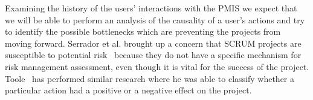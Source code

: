 \documentclass[a4paper, 12pt]{article}
\begin{document}
Examining the history of the users’ interactions with the PMIS we expect that we will be able to perform an analysis of the causality of a user’s actions and try to identify the possible bottlenecks which are preventing the projects from moving forward. Serrador et al. brought up a concern that SCRUM projects are susceptible to potential risk~\cite{tavares2019risk} because they do not have a specific mechanism for risk management assessment, even though it is vital for the success of the project. Toole~\cite{Toole2006APM} has performed similar research where he was able to classify whether a particular action had a positive or a negative effect on the project. 

%
%
%
%
%
%
%
%
%
%
%
%
\end{document}

